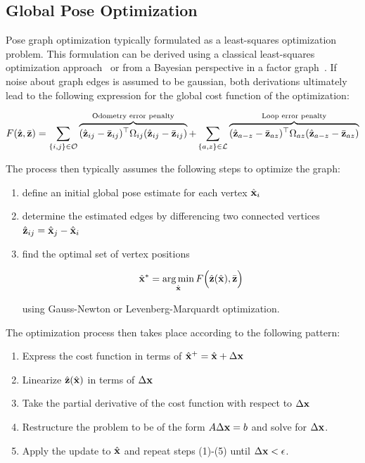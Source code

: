 \subsection{Global Pose Optimization}


Pose graph optimization typically formulated as a least-squares optimization problem.  This formulation can be derived using a classical least-squares optimization approach~\cite{Kummerle2011} or from a Bayesian perspective in a factor graph~\cite{Kaess2008}.  If noise about graph edges is assumed to be gaussian, both derivations ultimately lead to the following expression for the global cost function of the optimization:

\begin{align}
  F(\hat{\mathbf{z}},\bar{\mathbf{z}}) = \sum_{\{i,j\} \in \mathcal{O}} \overbrace{(\hat{\mathbf{z}}_{ij}-\bar{\mathbf{z}}_{ij})^\top\Omega_{ij}(\hat{\mathbf{z}}_{ij}-\bar{\mathbf{z}}_{ij})}^\text{Odometry error penalty} + \sum_{\{a,z\} \in \mathcal{L}} \overbrace{ (\hat{\mathbf{z}}_{a-z}-\bar{\mathbf{z}}_{az})^\top \Omega_{az} (\hat{\mathbf{z}}_{a-z}-\bar{\mathbf{z}}_{az}) }^\text{Loop error penalty}
  \label{eqn:cost_function}
\end{align}

The process then typically assumes the following steps to optimize the graph:

\begin{enumerate}
  \item define an initial global pose estimate for each vertex $\hat{\mathbf{x}}_i$
  \item determine the estimated edges by differencing two connected vertices $\hat{\mathbf{z}}_{ij} = \hat{\mathbf{x}}_j - \hat{\mathbf{x}}_i$
  \item find the optimal set of vertex positions

  \begin{align}
      \hat{\mathbf{x}}^* = \operatorname*{arg\,min}_{\hat{\mathbf{x}}} F\Big(\hat{\mathbf{z}}(\hat{\mathbf{x}}),\bar{\mathbf{z}} \Big)
	     \label{eqn:global_opt}
	\end{align}


   using Gauss-Newton or Levenberg-Marquardt optimization.
\end{enumerate}

The optimization process then takes place according to the following pattern:
\begin{enumerate}
	\item Express the cost function in terms of $\hat{\mathbf{x}}^+ = \hat{\mathbf{x}} + \Delta\mathbf{x}$
	\item Linearize $\hat{\mathbf{z}}(\hat{\mathbf{x}})$ in terms of $\Delta\mathbf{x}$
	\item Take the partial derivative of the cost function with respect to $\Delta\mathbf{x}$
	\item Restructure the problem to be of the form $A \Delta \mathbf{x} = b$ and solve for $\Delta\mathbf{x}$.
	\item Apply the update to $\hat{\mathbf{x}}$ and repeat steps (1)-(5) until $\Delta\mathbf{x} < \epsilon$.
 \end{enumerate}

